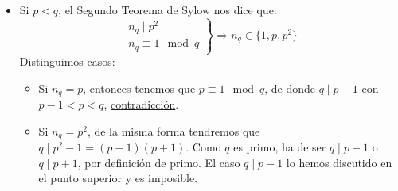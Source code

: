 \begin{ejercicio}
\begin{description}
\begin{itemize}
\begin{equation*}
\begin{array}{r}
                            n_p < q < p \\
                            n_p \equiv 1 \mod p
                        \end{array}\right. \Longrightarrow n_p = 1
                    \end{equation*}
                    Como tenemos un único $p-$subgrupo de Sylow de $G$, llamémoslo $P<G$, será $P\lhd G$, con $|P| = p^2$, luego $P$ es abeliano y en particular, resoluble. Como:
                    \begin{equation*}
                        |G/P| = q
                    \end{equation*}
                    Tendremos que $G/P\cong \mathbb{Z}_q$, luego también será resoluble, de donde $G$ será resoluble.
                    \item Si $p<q$, el Segundo Teorema de Sylow nos dice que:
                        \begin{equation*}
                            \left.\begin{array}{r}
                                n_q \mid p^2 \\
                                n_q \equiv 1 \mod q
                            \end{array}\right\} \Longrightarrow n_q \in \{1,p,p^2\}
                        \end{equation*}
                        Distinguimos casos:
                        \begin{itemize}
                            \item Si $n_q = p$, entonces tenemos que $p\equiv 1 \mod q$, de donde $q\mid p-1$ con $p-1<p<q$, \underline{contradicción}.
                            \item Si $n_q = p^2$, de la misma forma tendremos que $q\mid p^2-1 = (p-1)(p+1)$. Como $q$ es primo, ha de ser $q\mid p-1$ o $q\mid p+1$, por definición de primo. El caso $q\mid p-1$ lo hemos discutido en el punto superior y es imposible.


\end{itemize}
\end{itemize}
\end{description}
\end{ejercicio}
